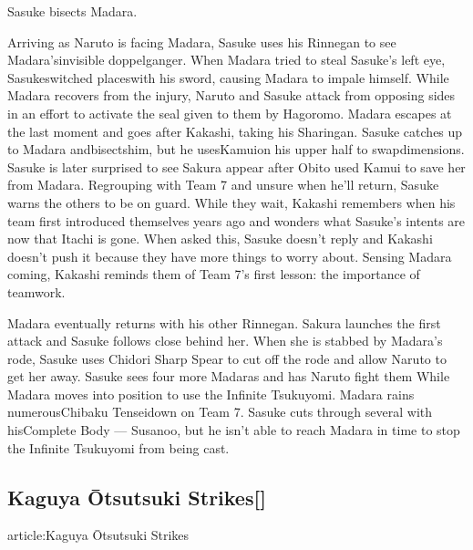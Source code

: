 \documentclass[a4paper,12pt]{article}
\begin{document}
Sasuke bisects Madara.\\ \par \vspace{0.5cm}

Arriving as Naruto is facing Madara, Sasuke uses his Rinnegan to see Madara'sinvisible doppelganger. When Madara tried to steal Sasuke's left eye, Sasukeswitched placeswith his sword, causing Madara to impale himself. While Madara recovers from the injury, Naruto and Sasuke attack from opposing sides in an effort to activate the seal given to them by Hagoromo. Madara escapes at the last moment and goes after Kakashi, taking his Sharingan. Sasuke catches up to Madara andbisectshim, but he usesKamuion his upper half to swapdimensions. Sasuke is later surprised to see Sakura appear after Obito used Kamui to save her from Madara. Regrouping with Team 7 and unsure when he'll return, Sasuke warns the others to be on guard. While they wait, Kakashi remembers when his team first introduced themselves years ago and wonders what Sasuke's intents are now that Itachi is gone. When asked this, Sasuke doesn't reply and Kakashi doesn't push it because they have more things to worry about. Sensing Madara coming, Kakashi reminds them of Team 7's first lesson: the importance of teamwork.\\ \par \vspace{0.5cm}

Madara eventually returns with his other Rinnegan. Sakura launches the first attack and Sasuke follows close behind her. When she is stabbed by Madara's rode, Sasuke uses Chidori Sharp Spear to cut off the rode and allow Naruto to get her away. Sasuke sees four more Madaras and has Naruto fight them While Madara moves into position to use the Infinite Tsukuyomi. Madara rains numerousChibaku Tenseidown on Team 7. Sasuke cuts through several with hisComplete Body — Susanoo, but he isn't able to reach Madara in time to stop the Infinite Tsukuyomi from being cast.\\ \par \vspace{0.5cm}

\subsection*{Kaguya Ōtsutsuki Strikes[]}\n\nMain article:Kaguya Ōtsutsuki Strikes\\ \par \vspace{0.5cm}
\end{document}
